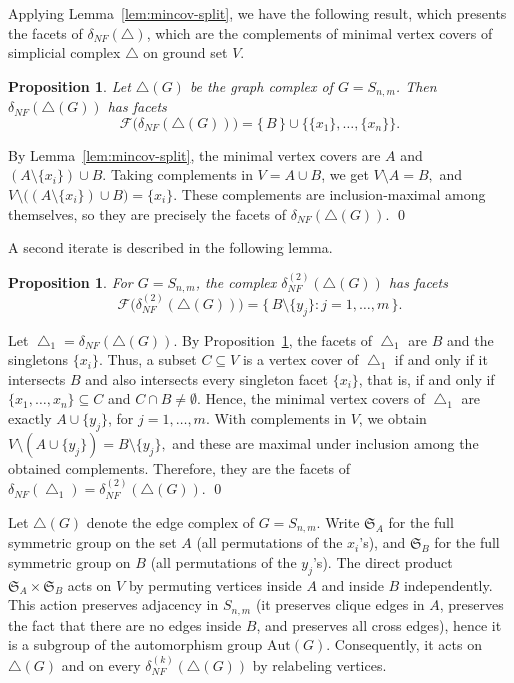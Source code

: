 \documentclass[12pt]{article}
\renewenvironment{proof}{{\noindent\bfseries Proof.}}{\qed}
\theoremstyle{plain}
\newtheorem{proposition}[theorem]{Proposition}
\theoremstyle{definition}
\begin{document}
	\medskip
	Applying Lemma~\ref{lem:mincov-split}, we have the following result, which presents the facets of $\delta_{NF}(\bigtriangleup)$, which 
	are the complements of minimal vertex covers of simplicial complex $\bigtriangleup $ on ground set $V$.
	\begin{proposition}\label{prop:NF1-split}
		Let $\bigtriangleup(G)$ be the graph complex of $G=S_{n,m}$.
		Then $\delta_{NF}(\bigtriangleup(G))$ has facets
		\[
		\mathcal{F}\bigl(\delta_{NF}(\bigtriangleup(G))\bigr)
		=\{\,B\,\} \cup \bigl\{\{x_1\},\dots,\{x_n\}\bigr\}.
		\]
	\end{proposition}
	
	\begin{proof}
		By Lemma~\ref{lem:mincov-split}, the minimal vertex covers are
		$A$ and $(A\setminus\{x_i\})\cup B$.
		Taking complements in $V=A\cup B$, we get  $V\setminus A = B,$ and $V\setminus\bigl((A\setminus\{x_i\})\cup B\bigr)=\{x_i\}.$ These complements are inclusion-maximal among themselves, so they are precisely
		the facets of $\delta_{NF}(\bigtriangleup(G))$.
	\end{proof}
	
	\medskip 
	A second iterate is described in the following lemma.	
	\begin{proposition}\label{prop:NF2-split}
		For $G=S_{n,m}$, the complex $\delta_{NF}^{(2)}(\bigtriangleup(G))$ has facets
		\[
		\mathcal{F}\bigl(\delta_{NF}^{(2)}(\bigtriangleup(G))\bigr)
		=\bigl\{\,B\setminus\{y_j\} : j=1,\dots,m\,\bigr\}.
		\]
	\end{proposition}
	
	\begin{proof}
		Let $\bigtriangleup_1=\delta_{NF}(\bigtriangleup(G))$.
		By Proposition~\ref{prop:NF1-split}, the facets of $\bigtriangleup_1$ are $B$ and the singletons
		$\{x_i\}$.
		Thus, a subset $C\subseteq V$ is a vertex cover of $\bigtriangleup_1$ if and only if it intersects $B$
		and also intersects every singleton facet $\{x_i\}$, that is, if and only if
		 $\{x_1,\dots,x_n\}\subseteq C$ and $C\cap B\neq\emptyset.$ Hence, the minimal vertex covers of $\bigtriangleup_1$ are exactly $A\cup\{y_j\}$,  for $j=1,\dots,m.$
		With complements in $V$, we obtain $V\setminus (A\cup\{y_j\}) = B\setminus\{y_j\},$ and these are maximal under inclusion among the obtained complements. Therefore, they are the facets of $\delta_{NF}(\bigtriangleup_1)=\delta_{NF}^{(2)}(\bigtriangleup(G))$.
	\end{proof}
	
	\medskip
	  	Let $\bigtriangleup(G)$ denote the edge complex of $G=S_{n,m}$. Write $\mathfrak{S}_A$ for the full symmetric group on the set $A$ (all permutations of the $x_i$'s),	and $\mathfrak{S}_B$ for the full symmetric group on $B$ (all permutations of the $y_j$'s). The direct product $\mathfrak{S}_A\times \mathfrak{S}_B$ 
	acts on $V$ by permuting vertices inside $A$ and inside $B$ independently.
	This action preserves adjacency in $S_{n,m}$ (it preserves clique edges in $A$, preserves
	the fact that there are no edges inside $B$, and preserves all cross edges), hence it is a subgroup
	of the automorphism group $\mathrm{Aut}(G)$. Consequently, it acts on $\bigtriangleup(G)$ and on every $\delta_{NF}^{(k)}(\bigtriangleup(G))$
	by relabeling vertices.
	
\end{document}
